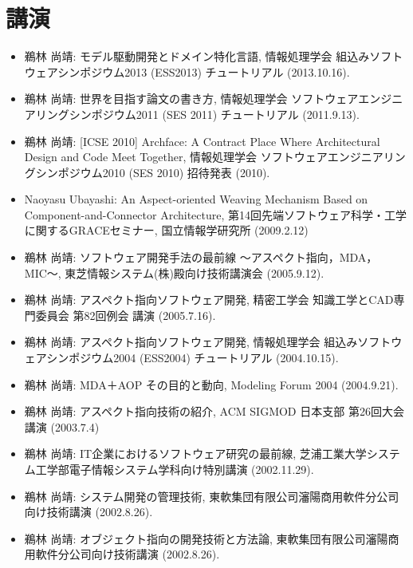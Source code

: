 \documentclass{jarticle}
\begin{document}
\section{講演}

\begin{itemize}
\item 鵜林 尚靖:
モデル駆動開発とドメイン特化言語,
情報処理学会 組込みソフトウェアシンポジウム2013 (ESS2013) チュートリアル
(2013.10.16).

\item 鵜林 尚靖:
世界を目指す論文の書き方,
情報処理学会 ソフトウェアエンジニアリングシンポジウム2011 (SES 2011) チュートリアル
(2011.9.13).

\item 鵜林 尚靖:
[ICSE 2010] Archface: A Contract Place Where Architectural Design and Code Meet Together,
情報処理学会 ソフトウェアエンジニアリングシンポジウム2010 (SES 2010) 招待発表 (2010).

\item Naoyasu Ubayashi:
An Aspect-oriented Weaving Mechanism Based on Component-and-Connector Architecture,
第14回先端ソフトウェア科学・工学に関するGRACEセミナー, 国立情報学研究所
(2009.2.12)

\item 鵜林 尚靖:
ソフトウェア開発手法の最前線 〜アスペクト指向，MDA，MIC〜,
東芝情報システム(株)殿向け技術講演会
(2005.9.12).

\item 鵜林 尚靖:
アスペクト指向ソフトウェア開発,
精密工学会 知識工学とCAD専門委員会 第82回例会 講演
(2005.7.16).

\item 鵜林 尚靖:
アスペクト指向ソフトウェア開発,
情報処理学会 組込みソフトウェアシンポジウム2004 (ESS2004) チュートリアル
(2004.10.15).

\item 鵜林 尚靖:
MDA＋AOP その目的と動向,
Modeling Forum 2004
(2004.9.21).

\item 鵜林 尚靖:
アスペクト指向技術の紹介,
ACM SIGMOD 日本支部 第26回大会講演
(2003.7.4)

\item 鵜林 尚靖:
IT企業におけるソフトウェア研究の最前線,
芝浦工業大学システム工学部電子情報システム学科向け特別講演
(2002.11.29).

\item 鵜林 尚靖:
システム開発の管理技術,
東軟集団有限公司瀋陽商用軟件分公司向け技術講演
(2002.8.26).

\item 鵜林 尚靖:
オブジェクト指向の開発技術と方法論,
東軟集団有限公司瀋陽商用軟件分公司向け技術講演
(2002.8.26).
\end{itemize}
\end{document}
